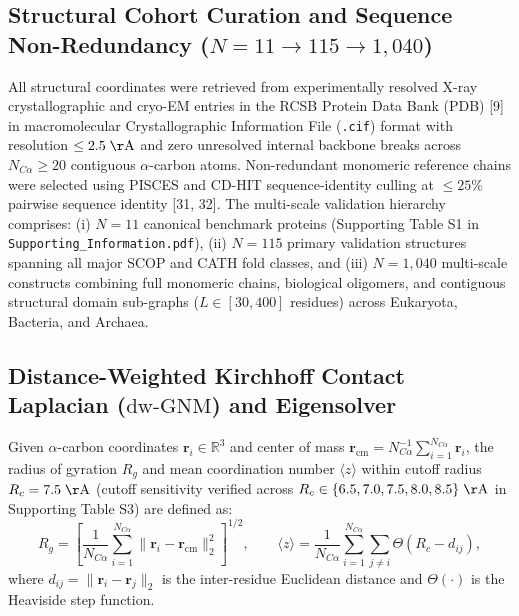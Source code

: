 \documentclass[11pt,onecolumn,letterpaper]{article}
\begin{document}
\subsection{Structural Cohort Curation and Sequence Non-Redundancy ($N = 11 \rightarrow 115 \rightarrow 1,040$)}
All structural coordinates were retrieved from experimentally resolved X-ray crystallographic and cryo-EM entries in the RCSB Protein Data Bank (PDB) [9] in macromolecular Crystallographic Information File (\texttt{.cif}) format with resolution $\le 2.5\;\mathrm{\AA}$ and zero unresolved internal backbone breaks across $N_{C\alpha} \ge 20$ contiguous $\alpha$-carbon atoms. Non-redundant monomeric reference chains were selected using PISCES and CD-HIT sequence-identity culling at $\le 25\%$ pairwise sequence identity [31, 32]. The multi-scale validation hierarchy comprises: (i) $N = 11$ canonical benchmark proteins (Supporting Table S1 in \texttt{Supporting\_Information.pdf}), (ii) $N = 115$ primary validation structures spanning all major SCOP and CATH fold classes, and (iii) $N = 1,040$ multi-scale constructs combining full monomeric chains, biological oligomers, and contiguous structural domain sub-graphs ($L \in [30, 400]$ residues) across Eukaryota, Bacteria, and Archaea.

\subsection{Distance-Weighted Kirchhoff Contact Laplacian ($\mathrm{dw\text{-}GNM}$) and Eigensolver}
Given $\alpha$-carbon coordinates $\mathbf{r}_i \in \mathbb{R}^3$ and center of mass $\mathbf{r}_{\mathrm{cm}} = N_{C\alpha}^{-1} \sum_{i=1}^{N_{C\alpha}} \mathbf{r}_i$, the radius of gyration $R_g$ and mean coordination number $\langle z \rangle$ within cutoff radius $R_c = 7.5\;\mathrm{\AA}$ (cutoff sensitivity verified across $R_c \in \{6.5, 7.0, 7.5, 8.0, 8.5\}\;\mathrm{\AA}$ in Supporting Table S3) are defined as:
\begin{equation}
R_g = \left[ \frac{1}{N_{C\alpha}} \sum_{i=1}^{N_{C\alpha}} \|\mathbf{r}_i - \mathbf{r}_{\mathrm{cm}}\|_2^2 \right]^{1/2}, \qquad \langle z \rangle = \frac{1}{N_{C\alpha}} \sum_{i=1}^{N_{C\alpha}} \sum_{j \neq i} \Theta(R_c - d_{ij}),
\end{equation}
where $d_{ij} = \|\mathbf{r}_i - \mathbf{r}_j\|_2$ is the inter-residue Euclidean distance and $\Theta(\cdot)$ is the Heaviside step function.
\end{document}
